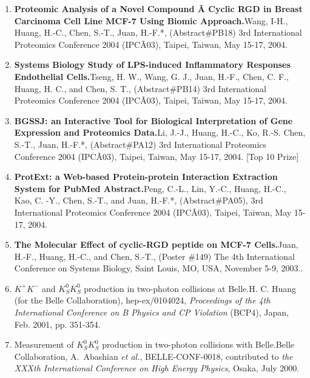 \documentclass[10pt,a4paper]{article}
\def\mypub#1#2#3{{#1.}\newline #2, #3.}
\def\newpub#1#2#3{{\boldmath \bf #2.}\newline #1, #3.}
\def\etal{{\it et al.}}
\begin{document}
\begin{enumerate}
\item
\newpub
{Wang, I-H., Huang, H.-C., Chen, S.-T., Juan, H.-F.*}
{Proteomic Analysis of a Novel Compound Ã Cyclic RGD in Breast Carcinoma Cell Line MCF-7 Using Biomic Approach}
{(Abstract\#PB18) 3rd International Proteomics Conference 2004 (IPCÃ03), Taipei, Taiwan, May 15-17, 2004}

\item
\newpub
{Tseng, H. W., Wang, G. J., Juan, H.-F., Chen, C. F., Huang, H. C., and Chen, S. T.}
{Systems Biology Study of LPS-induced Inflammatory Responses Endothelial Cells}
{ (Abstract\#PB14) 3rd International Proteomics Conference 2004 (IPCÃ03), Taipei, Taiwan, May 15-17, 2004}

\item
\newpub
{Li, J.-J., Huang, H.-C., Ko, R.-S. Chen, S.-T., Juan, H.-F.*}
{BGSSJ: an Interactive Tool for Biological Interpretation of Gene Expression and Proteomics Data}
{(Abstract\#PA12) 3rd International Proteomics Conference 2004 (IPCÃ03), Taipei, Taiwan, May 15-17, 2004}
[Top 10 Prize]

\item
\newpub
{Peng, C.-L., Lin, Y.-C., Huang, H.-C., Kao, C. -Y., Chen, S.-T., and Juan, H.-F.*}
{ProtExt: a Web-based Protein-protein Interaction Extraction System for PubMed Abstract}
{(Abstract\#PA05), 3rd International Proteomics Conference 2004 (IPCÃ03), Taipei, Taiwan, May 15-17, 2004}

\item
\newpub
{Juan, H.-F., Huang, H.-C., and Chen, S.-T.}
{The Molecular Effect of cyclic-RGD peptide on MCF-7 Cells}
{(Poster \#149) The 4th International Conference on Systems Biology, Saint Louis, MO, USA, November 5-9, 2003.}

\item 
\mypub{$K^+ K^-$ and $K^0_S K^0_S$ production in two-photon collisions
at Belle} 
{H. C. Huang (for the Belle Collaboration)}
{hep-ex/0104024, {\it Proceedings of the 4th International Conference
on B Physics and CP Violation} (BCP4), Japan, Feb. 2001, pp. 351-354}

\item 
\mypub{Measurement of $K_S^0 K_S^0$ production in two-photon
collisions with Belle} 
{Belle Collaboration, A.~Abashian \etal}
{BELLE-CONF-0018, contributed to {\it the XXXth International Conference
on High Energy Physics}, Osaka, July 2000}




\end{enumerate}
\end{document}
